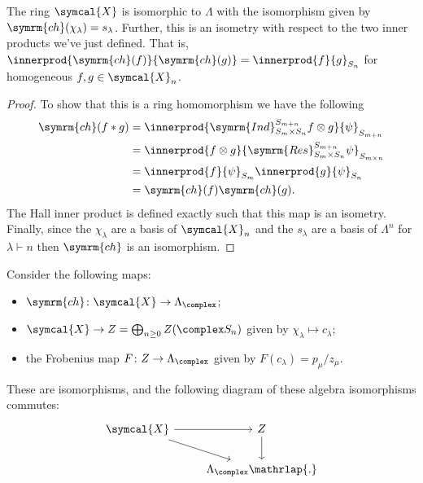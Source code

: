 \documentclass[fleqn]{NotesClass}
\newcommand{\classFunctions}{\symcal{X}}
\newcommand{\partition}{\vdash}
\newcommand{\Res}{\symrm{Res}}
\newcommand{\Ind}{\symrm{Ind}}
\newcommand{\ch}{\symrm{ch}}
\begin{document}
    \begin{thm}{}{}
        The ring \(\classFunctions\) is isomorphic to \(\Lambda\) with the isomorphism given by \(\ch(\chi_\lambda) = s_\lambda\).
        Further, this is an isometry with respect to the two inner products we've just defined.
        That is, \(\innerprod{\ch(f)}{\ch(g)} = \innerprod{f}{g}_{S_n}\) for homogeneous \(f, g \in \classFunctions_n\).
        \begin{proof}
            To show that this is a ring homomorphism we have the following
            \begin{align}
                \ch(f * g) &= \innerprod{\Ind^{S_{m+n}}_{S_m \times S_n} f \otimes g}{\psi}_{S_{m+n}}\\
                &= \innerprod{f \otimes g}{\Res^{S_{m+n}}_{S_m \times S_n} \psi}_{S_{m\times n}}\\
                &= \innerprod{f}{\psi}_{S_m} \innerprod{g}{\psi}_{S_n}\\
                &= \ch(f) \ch(g).
            \end{align}
            The Hall inner product is defined exactly such that this map is an isometry.
            Finally, since the \(\chi_\lambda\) are a basis of \(\classFunctions_n\) and the \(s_\lambda\) are a basis of \(\Lambda^n\) for \(\lambda \partition n\) then \(\ch\) is an isomorphism.
        \end{proof}
    \end{thm}
    
    \begin{thm}{}{}
        Consider the following maps:
        \begin{itemize}
            \item \(\ch \colon \classFunctions \to \Lambda_{\complex}\);
            \item \(\classFunctions \to Z = \bigoplus_{n \ge 0} Z(\complex S_n)\) given by \(\chi_\lambda \mapsto c_\lambda\);
            \item the Frobenius map \(F \colon Z \to \Lambda_{\complex}\) given by \(F(c_\lambda) = p_\mu/z_\mu\).
        \end{itemize}
        These are isomorphisms, and the following diagram of these algebra isomorphisms commutes:
        \begin{equation}
            \begin{tikzcd}
                \classFunctions \arrow[r] \arrow[dr] & Z \arrow[d]\\
                & \Lambda_{\complex}\mathrlap{.}
            \end{tikzcd}
        \end{equation}
    \end{thm}
    
\end{document}
